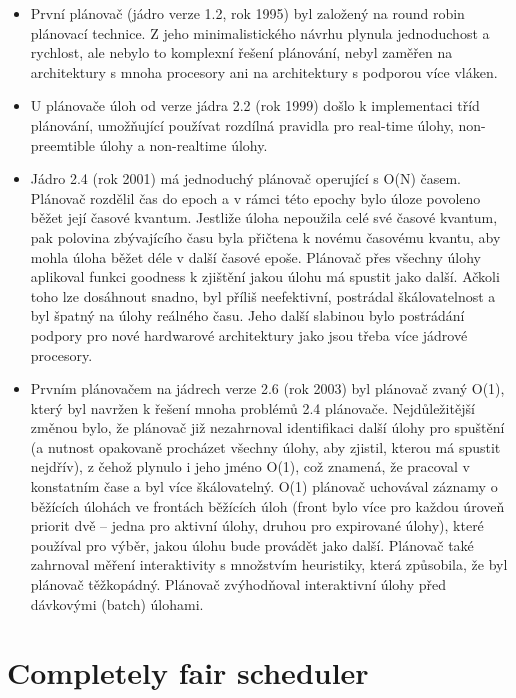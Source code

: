 \documentclass[
  field=ainfk,
  biblatex,
  glossaries,
  index
]{kidiplom}
\begin{document}
\begin{itemize}

\item První plánovač (jádro verze 1.2, rok 1995) byl založený na round robin plánovací technice. Z jeho minimalistického návrhu plynula jednoduchost a rychlost, ale nebylo to komplexní řešení plánování, nebyl zaměřen na architektury s mnoha procesory ani na architektury s podporou více vláken.

\item U plánovače úloh od verze jádra 2.2 (rok 1999) došlo k implementaci tříd plánování, umožňující používat rozdílná pravidla pro real-time úlohy, non-preemtible úlohy a non-realtime úlohy.

\item Jádro 2.4 (rok 2001) má jednoduchý plánovač operující s O(N) časem. Plánovač rozdělil čas do epoch a v rámci této epochy bylo úloze povoleno běžet její časové kvantum. Jestliže úloha nepoužila celé své časové kvantum, pak polovina zbývajícího času byla přičtena k novému časovému kvantu, aby mohla úloha běžet déle v další časové epoše. Plánovač přes všechny úlohy aplikoval funkci goodness k zjištění jakou úlohu má spustit jako další. Ačkoli toho lze dosáhnout snadno, byl příliš neefektivní, postrádal škálovatelnost a byl špatný na úlohy reálného času. Jeho další slabinou bylo postrádání podpory pro nové hardwarové architektury jako jsou třeba více jádrové procesory. 

\item Prvním plánovačem na jádrech verze 2.6 (rok 2003) byl plánovač zvaný O(1), který byl navržen k řešení mnoha problémů 2.4 plánovače. \linebreak Nejdůležitější změnou bylo, že plánovač již nezahrnoval identifikaci další úlohy pro spuštění (a nutnost opakovaně procházet všechny úlohy, aby zjistil, kterou má spustit nejdřív), z čehož plynulo i jeho jméno O(1), což znamená, že pracoval v konstatním čase a byl více škálovatelný. O(1) plánovač uchovával záznamy o běžících úlohách ve frontách běžících úloh (front bylo více pro každou úroveň priorit dvě – jedna pro aktivní úlohy, druhou pro expirované úlohy), které používal pro výběr, jakou úlohu bude provádět jako další. Plánovač také zahrnoval měření interaktivity s množstvím heuristiky, která způsobila, že byl plánovač těžkopádný. Plánovač zvýhodňoval interaktivní úlohy před dávkovými (batch) úlohami.

\end{itemize}

\section{Completely fair scheduler}%
\end{document}
